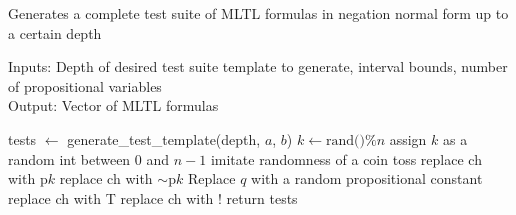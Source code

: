 \documentclass[runningheads]{llncs}
\begin{document}
\begin{algorithm}[H]
    \caption{Generates a complete test suite of MLTL formulas in negation normal form up to a certain depth}
    Inputs: Depth of desired test suite template to generate, interval bounds, number of propositional variables\\
    Output: Vector of MLTL formulas
    \begin{algorithmic}
        \State tests $\leftarrow$ generate\_test\_template(depth, $a$, $b$) 
                    \State $k \leftarrow \text{rand()} \% n$ 
                    \Comment assign $k$ as a random int between $0$ and $n - 1$
                    \Comment imitate randomness of a coin toss
                        \State replace ch with p$k$
                    \Else 
                        \State replace ch with $\scriptstyle{\sim}$p$k$
                    \EndIf
                \Comment Replace $q$ with a random propositional constant
                        \State replace ch with T
                    \Else 
                        \State replace ch with $!$
                    \EndIf
                \EndIf
            \EndFor
        \EndFor
    \State return tests
    \EndProcedure
    \end{algorithmic}
\end{algorithm}
\newpage
\end{document}
